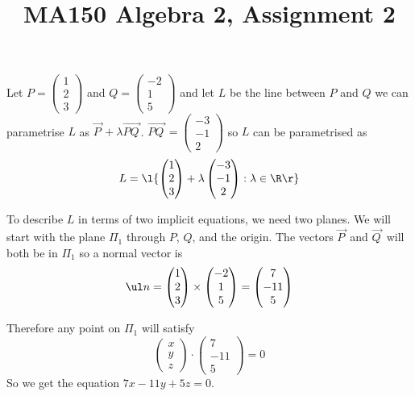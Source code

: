 \documentclass[a4paper]{article}
\title{MA150 Algebra 2, Assignment 2}
\begin{document}
\maketitle

\setlength{\parindent}{0em}
\setlength{\parskip}{1em}

Let $P = \begin{pmatrix}1\\ 2\\ 3\end{pmatrix}$ and $Q = \begin{pmatrix}-2\\ 1\\ 5\end{pmatrix}$ and let $L$ be the line between $P$ and $Q$ we can parametrise $L$ as $\overrightarrow{P\,} + \lambda \overrightarrow{PQ\,}$. $\overrightarrow{PQ\,} = \begin{pmatrix}-3\\ -1\\ 2\end{pmatrix}$ so $L$ can be parametrised as $$L = \l\{ \begin{pmatrix}1\\ 2\\ 3\end{pmatrix} + \lambda \begin{pmatrix}-3\\ -1\\ 2\end{pmatrix} : \lambda \in \R \r\}$$

To describe $L$ in terms of two implicit equations, we need two planes. We will start with the plane $\Pi_1$ through $P$, $Q$, and the origin. The vectors $\overrightarrow{P\,}$ and $\overrightarrow{Q\,}$ will both be in $\Pi_1$ so a normal vector is $$\ul n = \begin{pmatrix}1\\ 2\\ 3\end{pmatrix} \times \begin{pmatrix}-2\\ 1\\ 5\end{pmatrix} = \begin{pmatrix}7\\ -11\\ 5\end{pmatrix}$$

Therefore any point on $\Pi_1$ will satisfy $$\begin{pmatrix}x\\ y\\ z\end{pmatrix} \cdot \begin{pmatrix}7\\ -11\\ 5\end{pmatrix} = 0$$
So we get the equation $7x - 11y + 5z = 0$.
\end{document}
